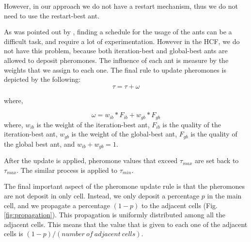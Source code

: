 			However, in our approach we do not have a restart mechanism, thus we do not need to use the restart-best ant. 

			As was pointed out by \cite{blum04}, finding a schedule for the usage of the ants can be a difficult task, and require a lot of experimentation. However in the HCF, we do not have this problem, because both iteration-best and global-best ants are allowed to deposit pheromones. The influence of each ant is measure by the weights that we assign to each one. The final rule to update pheromones is depicted by the following:
			\begin{equation}
				\tau = \tau + \omega
			\end{equation}
			
			where,
			
			\begin{equation}
				\omega = w_{ib} * F_{ib} + w_{gb} * F_{gb}
			\end{equation}
			where, $w_{ib}$ is the weight of the iteration-best ant, $F_{ib}$ is the quality of the iteration-best ant, $w_{gb}$ is the weight of the global-best ant, $F_{gb}$ is the quality of the global best ant, and $w_{ib} + w_{gb} = 1$.
			
			After the update is applied, pheromone values that exceed $\tau_{max}$ are set back to $\tau_{max}$. The similar process is applied to $\tau_{min}$.

			The final important aspect of the pheromone update rule is that the pheromones are not deposit in only cell. Instead, we only deposit a percentage $p$ in the main cell, and we propagate a percentage $(1-p)$ to the adjacent cells (Fig. \ref{fig:propagation}). This propagation is uniformly distributed among all the adjacent cells. This means that the value that is given to each one of the adjacent cells is $(1-p) / (number\ of\ adjacent\ cells)$.
			
			
			
			
			
			